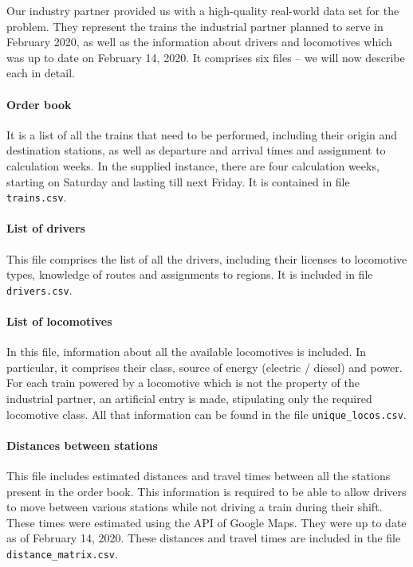 Our industry partner provided us with a high-quality real-world data set for the problem. They represent the trains the industrial partner planned to serve in February 2020, as well as the information about drivers and locomotives which was up to date on February 14, 2020.  It comprises six files -- we will now describe each in detail.

\paragraph{Order book} It is a list of all the trains that need to be performed, including their origin and destination stations, as well as departure and arrival times and assignment to calculation weeks. In the supplied instance, there are four calculation weeks, starting on Saturday and lasting till next Friday. It is contained in file \texttt{trains.csv}.

\paragraph{List of drivers} This file comprises the list of all the drivers, including their licenses to locomotive types, knowledge of routes and assignments to regions. It is included in file \texttt{drivers.csv}.

\paragraph{List of locomotives} In this file, information about all the available locomotives is included. In particular, it comprises their class, source of energy (electric / diesel) and power. For each train powered by a locomotive which is not the property of the industrial partner, an artificial entry is made, stipulating only the required locomotive class. All that information can be found in the file \texttt{unique\_locos.csv}.

\paragraph{Distances between stations} This file includes estimated distances and travel times between all the stations present in the order book. This information is required to be able to allow drivers to move between various stations while not driving a train during their shift. These times were estimated using the API of Google Maps. They were up to date as of February 14, 2020. These distances and travel times are included in the file \texttt{distance\_matrix.csv}.

